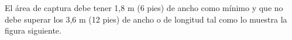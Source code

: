 El área de captura debe tener 1,8 m (6 pies) de ancho como mínimo y que no debe superar los 3,6 m (12 pies) de ancho o de longitud tal como lo muestra la figura siguiente.

\begin{figure}[H]
	\centering
	\label{fig:EntornoTrabajoKinect}
\end{figure}

\clearpage